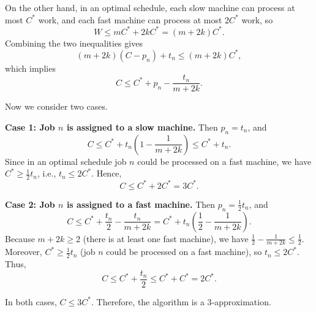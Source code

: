 On the other hand, in an optimal schedule, each slow machine can process at most $C^*$ work, and each fast machine can process at most $2C^*$ work, so
\[
W \le m C^* + 2k C^* = (m+2k)C^*.
\]
Combining the two inequalities gives
\[
(m+2k)(C - p_n) + t_n \le (m+2k)C^*,
\]
which implies
\[
C \le C^* + p_n - \frac{t_n}{m+2k}.
\]

Now we consider two cases.

\textbf{Case 1: Job $n$ is assigned to a slow machine.} Then $p_n = t_n$, and
\[
C \le C^* + t_n\left(1 - \frac{1}{m+2k}\right) \le C^* + t_n.
\]
Since in an optimal schedule job $n$ could be processed on a fast machine, we have $C^* \ge \frac{1}{2}t_n$, i.e., $t_n \le 2C^*$. Hence,
\[
C \le C^* + 2C^* = 3C^*.
\]

\textbf{Case 2: Job $n$ is assigned to a fast machine.} Then $p_n = \frac{1}{2}t_n$, and
\[
C \le C^* + \frac{t_n}{2} - \frac{t_n}{m+2k} = C^* + t_n\left(\frac{1}{2} - \frac{1}{m+2k}\right).
\]
Because $m+2k \ge 2$ (there is at least one fast machine), we have $\frac{1}{2} - \frac{1}{m+2k} \le \frac{1}{2}$. Moreover, $C^* \ge \frac{1}{2}t_n$ (job $n$ could be processed on a fast machine), so $t_n \le 2C^*$. Thus,
\[
C \le C^* + \frac{t_n}{2} \le C^* + C^* = 2C^*.
\]

In both cases, $C \le 3C^*$. Therefore, the algorithm is a 3‑approximation.


\newpage
